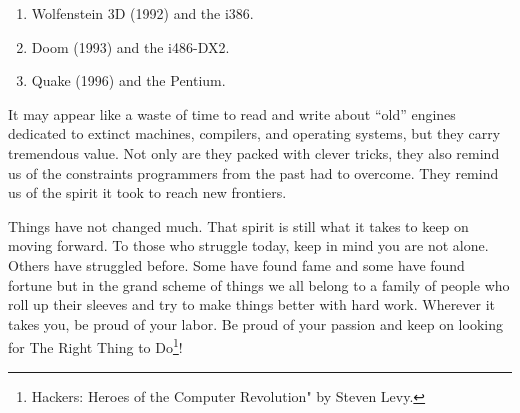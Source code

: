 \documentclass[book.tex]{subfiles}
\begin{document}
\begin{enumerate}
\item Wolfenstein 3D (1992) and the i386.
\item Doom (1993) and the i486-DX2.
\item Quake (1996) and the Pentium.
\end{enumerate}

\bigskip

It may appear like a waste of time to read and write about ``old'' engines dedicated to extinct machines, compilers, and operating systems, but they carry tremendous value. Not only are they packed with clever tricks, they also remind us of the constraints programmers from the past had to overcome. They remind us of the spirit it took to reach new frontiers.\\
\par
Things have not changed much. That spirit is still what it takes to keep on moving forward. To those who struggle today, keep in mind you are not alone. Others have struggled before. Some have found fame and some have found fortune but in the grand scheme of things we all belong to a family of people who roll up their sleeves and try to make things better with hard work. Wherever it takes you, be proud of your labor. Be proud of your passion and keep on looking for The Right Thing to Do\footnote{Hackers: Heroes of the Computer Revolution" by Steven Levy.}!\\
\end{document}
